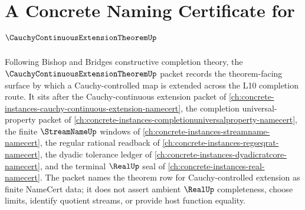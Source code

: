 \chapter{A Concrete Naming Certificate for $\CauchyContinuousExtensionTheoremUp$}
\label{ch:concrete-instances-cauchy-continuous-extension-theorem-namecert}

Following Bishop and Bridges constructive completion theory, the $\CauchyContinuousExtensionTheoremUp$ packet records the theorem-facing surface by which a Cauchy-controlled map is extended across the L10 completion route. It sits after the Cauchy-continuous extension packet of \autoref{ch:concrete-instances-cauchy-continuous-extension-namecert}, the completion universal-property packet of \autoref{ch:concrete-instances-completionuniversalproperty-namecert}, the finite $\StreamNameUp$ windows of \autoref{ch:concrete-instances-streamname-namecert}, the regular rational readback of \autoref{ch:concrete-instances-regseqrat-namecert}, the dyadic tolerance ledger of \autoref{ch:concrete-instances-dyadicratcore-namecert}, and the terminal $\RealUp$ seal of \autoref{ch:concrete-instances-real-namecert}. The packet names the theorem row for Cauchy-controlled extension as finite NameCert data; it does not assert ambient $\RealUp$ completeness, choose limits, identify quotient streams, or provide host function equality.

